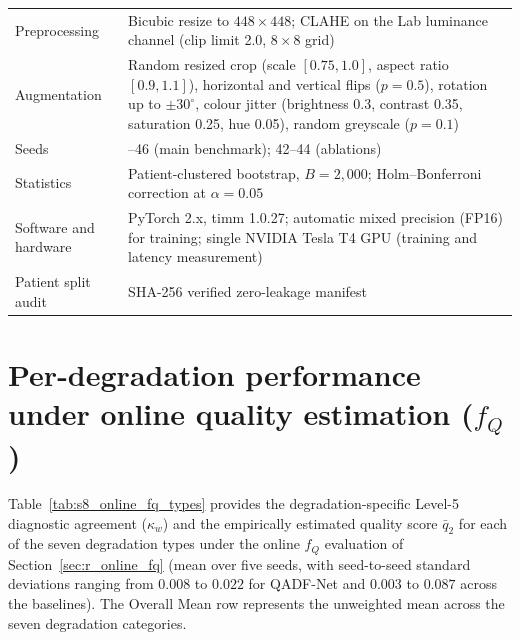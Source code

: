 \documentclass[final,5p,times,twocolumn,authoryear]{elsarticle}
\newcommand{\qadfnet}{QADF-Net}
\theoremstyle{plain}
\theoremstyle{remark}
\begin{document}
\begin{table}[!tb]
\begin{tabular}{@{}>{\raggedright\arraybackslash}p{}>{\raggedright\arraybackslash}p{}@{}}
Preprocessing & Bicubic resize to $448\times448$; CLAHE on the Lab luminance channel (clip limit 2.0, $8\times8$ grid) \\
Augmentation & Random resized crop (scale $[0.75,1.0]$, aspect ratio $[0.9,1.1]$), horizontal and vertical flips ($p=0.5$), rotation up to $\pm30^\circ$, colour jitter (brightness 0.3, contrast 0.35, saturation 0.25, hue 0.05), random greyscale ($p=0.1$) \\
Seeds & 42--46 (main benchmark); 42--44 (ablations) \\
Statistics & Patient-clustered bootstrap, $B=2{,}000$; Holm--Bonferroni correction at $\alpha=0.05$ \\
Software and hardware & PyTorch 2.x, timm 1.0.27; automatic mixed precision (FP16) for training; single NVIDIA Tesla T4 GPU (training and latency measurement) \\
Patient split audit & SHA-256 verified zero-leakage manifest \\
\bottomrule
\end{tabular}
\end{table}

\section{Per-degradation performance under online quality estimation \texorpdfstring{($f_Q$)}{(f\_Q)}}
\label{app:online_fq_types}

Table~\ref{tab:s8_online_fq_types} provides the degradation-specific Level-5 diagnostic agreement ($\kappa_w$) and the empirically estimated quality score $\bar{q}_2$ for each of the seven degradation types under the online $f_Q$ evaluation of Section~\ref{sec:r_online_fq} (mean over five seeds, with seed-to-seed standard deviations ranging from $0.008$ to $0.022$ for \qadfnet{} and $0.003$ to $0.087$ across the baselines). The Overall Mean row represents the unweighted mean across the seven degradation categories.
\end{document}
